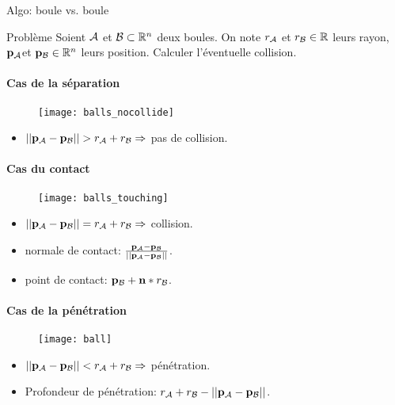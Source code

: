 \begin{frame}{Algo: boule vs. boule}
    \begin{block}{Problème}
        Soient $\mathcal{A}$ et $\mathcal{B} \subset \mathbb{R}^n$ deux boules.
        On note $r_{\mathcal{A}}$ et $r_{\mathcal{B}} \in \mathbb{R}$ leurs rayon, ${\bf p_\mathcal{A}}$et ${\bf p_\mathcal{B}} \in
        \mathbb{R}^n$ leurs position.  Calculer l’éventuelle collision.
    \end{block}
     {
    \begin{overlayarea}{10cm}{10cm}
     {
        \framesubtitle{Cas de la séparation}
        \begin{figure}[h]
            \texttt{[image: balls\_nocollide]}
        \end{figure}
        \begin{itemize}
            \item $|| {\bf p_\mathcal{A}} - {\bf p_\mathcal{B}} || > r_{\mathcal{A}} + r_{\mathcal{B}} \Rightarrow $ pas de collision.
        \end{itemize}
    }
     {
        \framesubtitle{Cas du contact}
        \begin{figure}[h]
            \texttt{[image: balls\_touching]}
        \end{figure}
        \begin{itemize}
            \item $|| {\bf p_\mathcal{A}} - {\bf p_\mathcal{B}} || = r_{\mathcal{A}} + r_{\mathcal{B}} \Rightarrow $ collision.
            \item normale de contact: $\frac{{\bf p_\mathcal{A}} - {\bf p_\mathcal{B}}}{|| {\bf p_\mathcal{A}} - {\bf p_\mathcal{B}} ||}$.
            \item point de contact: ${\bf p_\mathcal{B}} + {\bf n} * r_{\mathcal{B}}$.
        \end{itemize}
    }
     {
        \framesubtitle{Cas de la pénétration}
        \begin{figure}[h]
            \texttt{[image: ball]}
        \end{figure}
        \begin{itemize}
            \item $|| {\bf p_\mathcal{A}} - {\bf p_\mathcal{B}} || < r_{\mathcal{A}} + r_{\mathcal{B}} \Rightarrow $ pénétration.\\
            \item Profondeur de pénétration: $r_{\mathcal{A}} + r_{\mathcal{B}} - || {\bf p_\mathcal{A}} - {\bf p_\mathcal{B}} ||$.
        \end{itemize}
    }
    \end{overlayarea}
    }

\end{frame}


